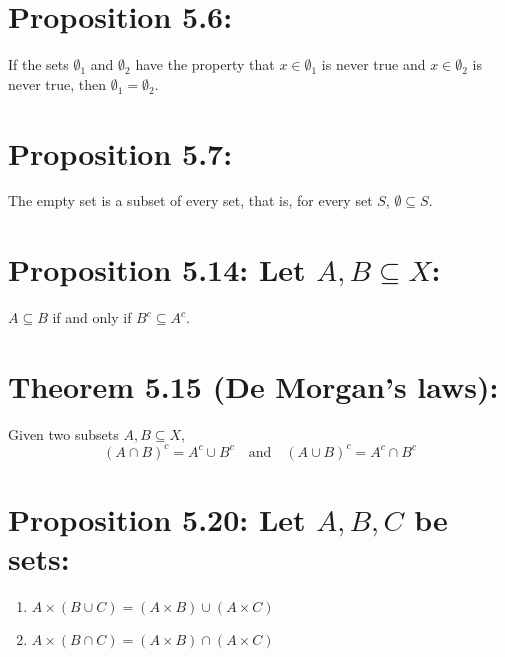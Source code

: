 \section*{Proposition 5.6:}
If the sets $\emptyset_1$ and $\emptyset_2$ have the property that $x \in \emptyset_1$ is never true and $x \in \emptyset_2$ is never true, then $\emptyset_1 = \emptyset_2$.

\section*{Proposition 5.7:}
The empty set is a subset of every set, that is, for every set $S$, $\emptyset \subseteq S$.

\section*{Proposition 5.14: Let $A,B \subseteq X$:}
$A \subseteq B$ if and only if $B^c \subseteq A^c$.

\section*{Theorem 5.15 (De Morgan’s laws):}
Given two subsets $A,B \subseteq X$,
\[ (A \cap B)^c = A^c \cup B^c \quad \text{and} \quad (A \cup B)^c = A^c \cap B^c \]

\section*{Proposition 5.20: Let $A,B,C$ be sets:}
\begin{enumerate}
    \item $A \times (B \cup C) = (A \times B) \cup (A \times C)$
    \item $A \times (B \cap C) = (A \times B) \cap (A \times C)$
\end{enumerate}

